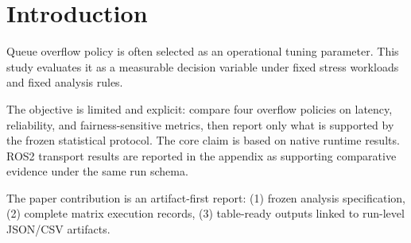 \section{Introduction}
Queue overflow policy is often selected as an operational tuning parameter.
This study evaluates it as a measurable decision variable under fixed stress workloads and fixed analysis rules.

The objective is limited and explicit: compare four overflow policies on latency, reliability, and fairness-sensitive
metrics, then report only what is supported by the frozen statistical protocol.
The core claim is based on native runtime results.
ROS2 transport results are reported in the appendix as supporting comparative evidence under the same run schema.

The paper contribution is an artifact-first report:
(1) frozen analysis specification,
(2) complete matrix execution records,
(3) table-ready outputs linked to run-level JSON/CSV artifacts.
